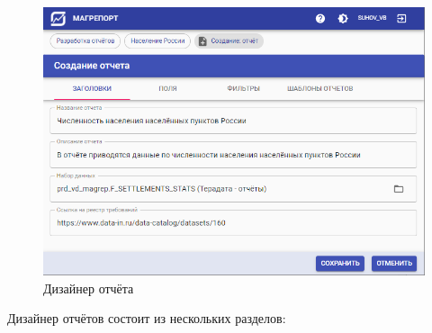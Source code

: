 \documentclass[../user-manual.tex]{subfiles}
\begin{document}
	\begin{figure}[h]
		\centering
		\includegraphics[width=\graphicswidth]{img/5-create-report.png}
		\caption{Дизайнер отчёта}
		\label{fig:create-report}
	\end{figure}

	Дизайнер отчётов состоит из нескольких разделов:
	
\end{document}
